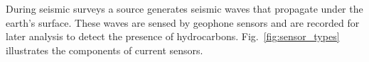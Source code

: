 During seismic surveys a source generates seismic waves that propagate under the earth's surface. 
These waves are sensed by geophone sensors and are recorded for later analysis to detect the presence of hydrocarbons. 
Fig.~\ref{fig:sensor_types} illustrates the components of current sensors. 

%


